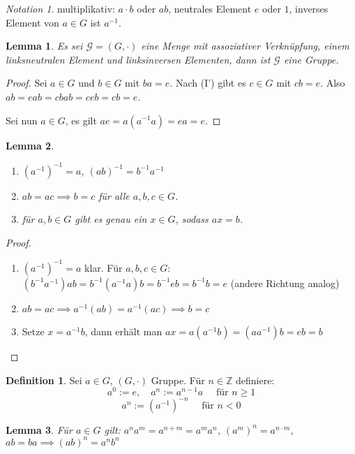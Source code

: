 \documentclass[fleqn, 12pt]{scrartcl}
\newtheorem{lemma}{Lemma}
\theoremstyle{definition}
\newtheorem*{defn}{Definition}
\theoremstyle{remark}
\newtheorem*{notation}{Notation}
\newcommand{\inv}[1]{\left(#1\right)^{-1}}
\newcommand{\Inv}[1]{#1^{-1}}
\begin{document}
\begin{notation}
    multiplikativ: \(a\cdot b\) oder \(ab\), neutrales Element \(e\) oder \(1\), inverses Element von \(a\in G\) ist \(\Inv a\).
\end{notation}

\begin{lemma}
    Es sei \(\mathcal{G}=(G,\cdot)\) eine Menge mit assoziativer Verknüpfung, einem linksneutralen Element und linksinversen Elementen, dann ist \(\mathcal{G}\) eine Gruppe.
\end{lemma}

\begin{proof}
    Sei \(a\in G\) und \(b\in G\) mit \(ba=e\). Nach (I') gibt es \(c\in G\) mit \(cb=e\). Also \(ab=eab=cbab=ceb=cb=e\).

    Sei nun \(a\in G\), es gilt \(ae=a(\Inv aa)=ea=e\).
\end{proof}

\begin{lemma}
    \begin{enumerate}
        \item \(\inv{\Inv{a}}=a\), \(\inv{ab}=\Inv b\Inv a\)
        \item \(ab=ac \implies b=c\) für alle \(a,b,c\in G\).
        \item für \(a,b\in G\) gibt es genau ein \(x\in G\), sodass \(ax=b\).
    \end{enumerate}
\end{lemma}

\begin{proof}
    \begin{enumerate}
        \item \(\inv{\Inv a}=a\) klar. Für \(a,b,c\in G\): \((\Inv b\Inv a)ab=\Inv b(\Inv aa)b=\Inv beb=\Inv bb=e\) (andere Richtung analog)
        \item \(ab=ac\implies \Inv a(ab)=\Inv a(ac)\implies b=c\)
        \item Setze \(x=\Inv ab\), dann erhält man \(ax=a(\Inv ab)=(a\Inv a)b=eb=b\)
    \end{enumerate}
\end{proof}

\begin{defn}
    Sei \(a\in G\), \((G,\cdot)\) Gruppe. Für \(n\in \mathbb{Z}\) definiere:
    \[a^0:=e, \quad a^n:=a^{n-1}a \quad \text{ für } n\geq 1\]
    \[a^n:=\left(\Inv a\right)^{-n} \quad \text{ für } n < 0\]
\end{defn}

\begin{lemma}
    Für \(a\in G\) gilt: \(a^n a^m=a^{n+m}=a^m a^n\), \(\left(a^m \right)^n = a^{n\cdot m}\), \(ab=ba \implies \left(ab \right)^n = a^n b^n\)
\end{lemma}
\end{document}
